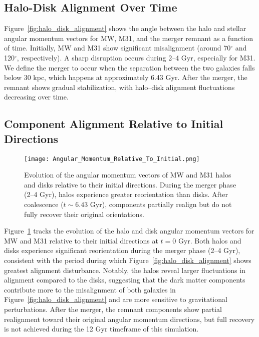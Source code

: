 \documentclass[twocolumn]{aastex631}
\begin{document}
\subsection{Halo-Disk Alignment Over Time}

Figure~\ref{fig:halo_disk_alignment} shows the angle between the halo and stellar angular momentum vectors for MW, M31, and the merger remnant as a function of time. Initially, MW and M31 show significant misalignment (around 70$^\circ$ and 120$^\circ$, respectively). A sharp disruption occurs during 2--4 Gyr, especially for M31. We define the merger to occur when the separation between the two galaxies falls below 30 kpc, which happens at approximately 6.43 Gyr. After the merger, the remnant shows gradual stabilization, with halo–disk alignment fluctuations decreasing over time.




\subsection{Component Alignment Relative to Initial Directions}
\begin{figure}[h!]
    \centering
    \texttt{[image: Angular\_Momentum\_Relative\_To\_Initial.png]}
    \caption{Evolution of the angular momentum vectors of MW and M31 halos and disks relative to their initial directions. During the merger phase (2--4 Gyr), halos experience greater reorientation than disks. After coalescence ($t \sim 6.43$ Gyr), components partially realign but do not fully recover their original orientations.}
    \label{fig:relative_alignment}
\end{figure}

Figure~\ref{fig:relative_alignment} tracks the evolution of the halo and disk angular momentum vectors for MW and M31 relative to their initial directions at $t = 0$ Gyr. Both halos and disks experience significant reorientation during the merger phase (2--4 Gyr), consistent with the period during which Figure~\ref{fig:halo_disk_alignment} shows greatest alignment disturbance. Notably, the halos reveal larger fluctuations in alignment compared to the disks, suggesting that the dark matter components contribute more to the misalignment of both galaxies in Figure~\ref{fig:halo_disk_alignment} and are more sensitive to gravitational perturbations. After the merger, the remnant components show partial realignment toward their original angular momentum directions, but full recovery is not achieved during the 12 Gyr timeframe of this simulation.
\end{document}
